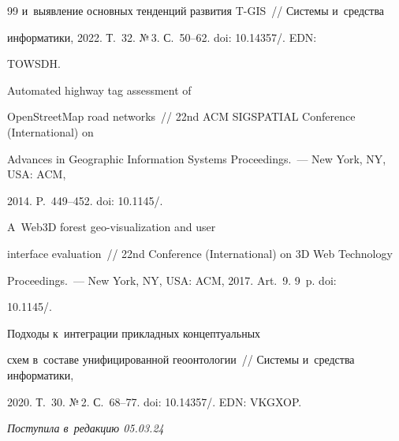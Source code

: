 {{\begin{thebibliography}{99}
и~выявление основных тенденций развития T-GIS~/\!\!/ Сис\-те\-мы и~средства 


информатики, 2022. Т.~32. №\,3. С.~50--62. doi: 10.14357\!/. EDN: 


TOWSDH.







 Automated highway tag assessment of 


OpenStreetMap road networks~/\!\!/ 22nd ACM SIGSPATIAL Conference (International)  on 


Advances in Geographic Information Systems Proceedings.~--- New York, NY, USA: ACM, 


2014. P.~449--452. doi: 10.1145\!/.




 A~Web3D forest geo-visualization and user 


interface evaluation~/\!\!/  22nd  Conference (International) on 3D Web Technology  


Proceedings.~--- New York, NY, USA: ACM, 2017. Art.~9. 9~p. doi: 


10.1145\!/.




 Подходы к~интеграции при\-клад\-ных концептуальных 


схем в~со\-ста\-ве унифицированной геоонтологии~/\!\!/ Сис\-те\-мы и~средства информатики, 


2020. Т.~30. №\,2. С.~68--77. doi: 10.14357\!/. EDN: VKGXOP.





     \end{thebibliography}


} }











\vspace*{-6pt}





\hfill{\small\textit{Поступила в~редакцию 05.03.24}}





